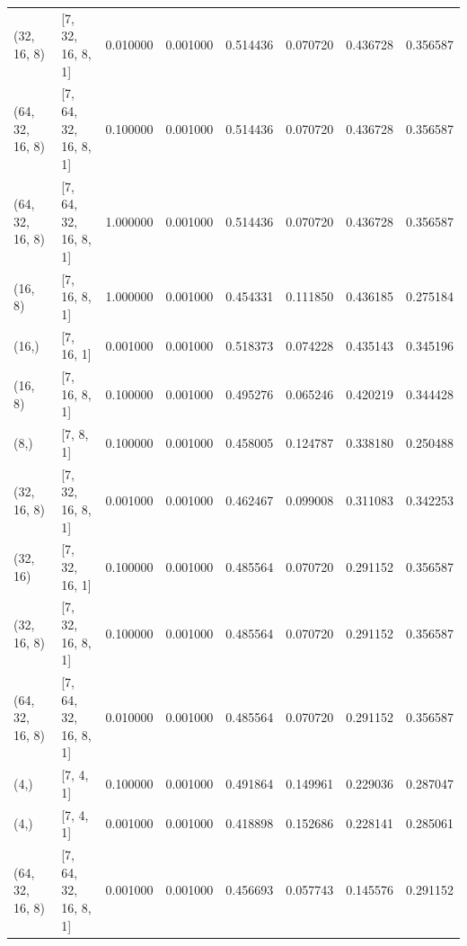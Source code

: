 \begin{tabular}{llrrrrrr}
(32, 16, 8) & [7, 32, 16, 8, 1] & 0.010000 & 0.001000 & 0.514436 & 0.070720 & 0.436728 & 0.356587 \\
(64, 32, 16, 8) & [7, 64, 32, 16, 8, 1] & 0.100000 & 0.001000 & 0.514436 & 0.070720 & 0.436728 & 0.356587 \\
(64, 32, 16, 8) & [7, 64, 32, 16, 8, 1] & 1.000000 & 0.001000 & 0.514436 & 0.070720 & 0.436728 & 0.356587 \\
(16, 8) & [7, 16, 8, 1] & 1.000000 & 0.001000 & 0.454331 & 0.111850 & 0.436185 & 0.275184 \\
(16,) & [7, 16, 1] & 0.001000 & 0.001000 & 0.518373 & 0.074228 & 0.435143 & 0.345196 \\
(16, 8) & [7, 16, 8, 1] & 0.100000 & 0.001000 & 0.495276 & 0.065246 & 0.420219 & 0.344428 \\
(8,) & [7, 8, 1] & 0.100000 & 0.001000 & 0.458005 & 0.124787 & 0.338180 & 0.250488 \\
(32, 16, 8) & [7, 32, 16, 8, 1] & 0.001000 & 0.001000 & 0.462467 & 0.099008 & 0.311083 & 0.342253 \\
(32, 16) & [7, 32, 16, 1] & 0.100000 & 0.001000 & 0.485564 & 0.070720 & 0.291152 & 0.356587 \\
(32, 16, 8) & [7, 32, 16, 8, 1] & 0.100000 & 0.001000 & 0.485564 & 0.070720 & 0.291152 & 0.356587 \\
(64, 32, 16, 8) & [7, 64, 32, 16, 8, 1] & 0.010000 & 0.001000 & 0.485564 & 0.070720 & 0.291152 & 0.356587 \\
(4,) & [7, 4, 1] & 0.100000 & 0.001000 & 0.491864 & 0.149961 & 0.229036 & 0.287047 \\
(4,) & [7, 4, 1] & 0.001000 & 0.001000 & 0.418898 & 0.152686 & 0.228141 & 0.285061 \\
(64, 32, 16, 8) & [7, 64, 32, 16, 8, 1] & 0.001000 & 0.001000 & 0.456693 & 0.057743 & 0.145576 & 0.291152 \\
\bottomrule
\end{tabular}
